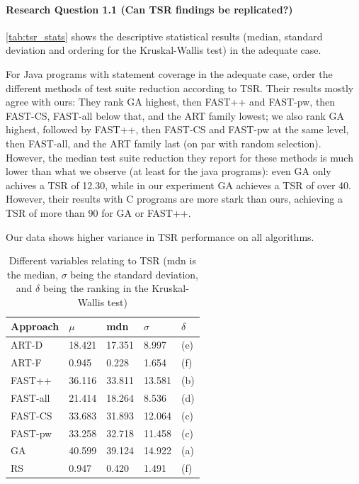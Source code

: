\paragraph{Research Question 1.1 (Can TSR findings be replicated?)}

\autoref{tab:tsr_stats} shows the descriptive statistical results
(median, standard deviation and ordering for the Kruskal-Wallis test)
in the adequate case.

For Java programs with statement coverage in the adequate case,
\cite{cruciani2019scalable} order the different methods of test suite
reduction according to TSR. Their results mostly agree with ours: They
rank GA highest, then FAST++ and FAST-pw, then FAST-CS, FAST-all below
that, and the ART family lowest; we also rank GA highest, followed by
FAST++, then FAST-CS and FAST-pw at the same level, then FAST-all, and
the ART family last (on par with random selection). However, the median
test suite reduction they report for these methods is much lower than what
we observe (at least for the java programs): even GA only achives a TSR
of 12.30, while in our experiment GA achieves a TSR of over 40. However,
their results with C programs are more stark than ours, achieving a TSR
of more than 90 for GA or FAST++.


Our data shows higher variance in TSR performance on all algorithms.

\begin{table}[htpb]
	\caption[TSR statistical results, adequate]{Different variables relating to TSR (mdn is the median, $\sigma$ being the standard deviation, and $\delta$ being the ranking in the Kruskal-Wallis test)}\label{tab:tsr_stats}
	\centering
	\begin{tabular}{| l | l | l | l | l |}
	\midrule
	Approach & $\mu$ & mdn & $\sigma$ & $\delta$ \\
	\midrule
	ART-D & 18.421 & 17.351 & 8.997 & (e) \\
	ART-F & 0.945 & 0.228 & 1.654 & (f) \\
	FAST++ & 36.116 & 33.811 & 13.581 & (b) \\
	FAST-all & 21.414 & 18.264 & 8.536 & (d) \\
	FAST-CS & 33.683 & 31.893 & 12.064 & (c) \\
	FAST-pw & 33.258 & 32.718 & 11.458 & (c) \\
	GA & 40.599 & 39.124 & 14.922 & (a) \\
	RS & 0.947 & 0.420 & 1.491 & (f) \\
	\bottomrule
	\end{tabular}
\end{table}

